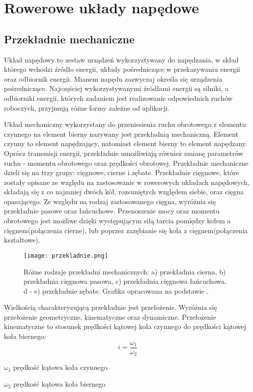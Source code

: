 \chapter{Rowerowe układy napędowe}

\section{Przekładnie mechaniczne}
Układ napędowy to zestaw urządzeń wykorzystywany do napędzania, w skład którego wchodzi źródło energii, układy pośredniczące w przekazywaniu energii oraz odbiornik energii. Mianem napędu zazwyczaj określa się urządzenia pośredniczące. Najczęściej wykorzystywanymi źródłami energii są silniki, a odbiorniki energii, których zadaniem jest realizowanie odpowiednich ruchów roboczych, przyjmują różne formy zależne od aplikacji.

Układ mechaniczny wykorzystany do przeniesienia ruchu obrotowego z elementu czynnego na element bierny nazywany jest przekładnią mechaniczną. Element czynny to element napędzający, natomiast element bierny to element napędzany. Oprócz transmisji energii, przekładnie umożliwiają również zmianę parametrów ruchu - momentu obrotowego oraz prędkości obrotowej. Przekładnie mechaniczne dzieli się na trzy grupy: cięgnowe, cierne i zębate. Przekładnie cięgnowe, które zostały opisane ze względu na zastosowanie w rowerowych układach napędowych, składają się z co najmniej dwóch kół, rozsuniętych względem siebie, oraz cięgna opasającego. Ze względu na rodzaj zastosowanego cięgna, wyróżnia się przekładnie pasowe oraz łańcuchowe. Przenoszenie mocy oraz momentu obrotowego jest możliwe dzięki występującym siłą tarcia pomiędzy kołem a cięgnem(połączenia cierne), lub poprzez zazębianie się koła z cięgnem(połączenia kształtowe).
\begin{figure}[h]
    \centering
    \texttt{[image: przekladnie.png]}
    \caption{Różne rodzaje przekładni mechanicznych: a) przekładnia cierna, b) przekładnia cięgnowa pasowa, c) przekładnia cięgnowa łańcuchowa, d - e) przekładnie zębate. Grafika opracowana na podstawie \cite{maszyny1}.}
    \label{fig:przekladnia}
\end{figure}

Wielkością charakteryzującą przekładnie jest przełożenie. Wyróżnia się przełożenie geometryczne, kinematyczne oraz dynamiczne. Przełożenie kinematyczne to stosunek prędkości kątowej koła czynnego do prędkości kątowej koła biernego\cite{przekladnie}:
\begin{equation}
    i = \frac{\omega_1}{\omega_2}
    \label{eq:przelozenieKinematyczne}
\end{equation}
\begin{eqwhere}[2cm]
	\item[$\omega_1$] prędkość kątowa koła czynnego
	\item[$\omega_2$] prędkość kątowa koła biernego
\end{eqwhere}


